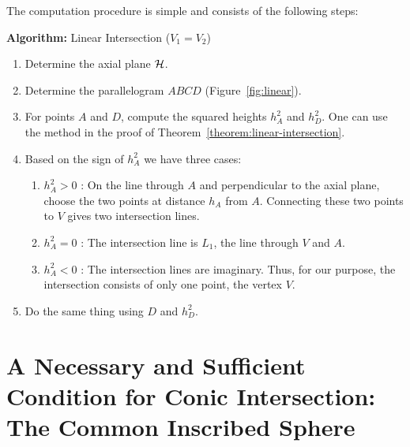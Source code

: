      The computation procedure is simple and consists of the following steps:
\begin{center}
\begin{minipage}{5in}
\vspace{8mm}
\begin{center}
     {\bf Algorithm:} Linear Intersection ($V_1=V_2$)
\end{center}
{\small
\begin{enumerate}
     \item Determine the axial plane ${\cal H}$.
     \item Determine the parallelogram $ABCD$ (Figure~\ref{fig:linear}).
     \item For points $A$ and $D$, compute the squared heights $h_A^2$ and
          $h_D^2$.  One can use the method in the proof of
          Theorem~\ref{theorem:linear-intersection}.
     \item Based on the sign of $h_A^2$ we have three cases:
     \begin{enumerate}
          \item $h_A^2>0$ : On the line through $A$ and perpendicular to
               the axial plane, choose the two points at distance $h_A$
               from $A$.  Connecting these two points to $V$ gives two
               intersection lines.
          \item $h_A^2=0$ : The intersection line is $L_1$, the line through
               $V$ and $A$.
          \item $h_A^2<0$ : The intersection lines are imaginary.  Thus, for
               our purpose, the intersection consists of only one point,
               the vertex $V$.
     \end{enumerate}
     \item Do the same thing using $D$ and $h_D^2$.
\end{enumerate}
}
\end{minipage}
\end{center}



\section{A Necessary and Sufficient Condition for Conic Intersection: The
     Common Inscribed Sphere}
\label{section:simplification}


